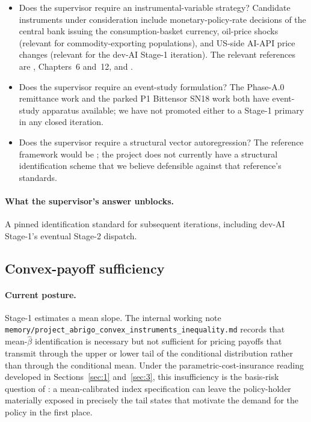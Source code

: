 \begin{itemize}
  \item Does the supervisor require an instrumental-variable strategy?
    Candidate instruments under consideration include
    monetary-policy-rate decisions of the central bank issuing the
    consumption-basket currency, oil-price shocks (relevant for
    commodity-exporting populations), and US-side AI-API price changes
    (relevant for the dev-AI Stage-1 iteration). The relevant references
    are \citet{hansen_2022}, Chapters~6 and~12, and
    \citet{wooldridge_2010}.
  \item Does the supervisor require an event-study formulation? The
    Phase-A.0 remittance work and the parked P1 Bittensor SN18 work both
    have event-study apparatus available; we have not promoted either to
    a Stage-1 primary in any closed iteration.
  \item Does the supervisor require a structural vector autoregression?
    The reference framework would be \citet{kilian_lutkepohl_2017}; the
    project does not currently have a structural identification scheme
    that we believe defensible against that reference's standards.
\end{itemize}

\paragraph{What the supervisor's answer unblocks.} A pinned identification
standard for subsequent iterations, including dev-AI Stage-1's eventual
Stage-2 dispatch.

\subsection{Convex-payoff sufficiency}\label{sec:7.2}

\paragraph{Current posture.} Stage-1 estimates a mean slope. The internal
working note
\texttt{memory/project\_abrigo\_convex\_instruments\_inequality.md}
records that mean-\(\hat{\beta}\) identification is necessary but not
sufficient for pricing payoffs that transmit through the upper or lower
tail of the conditional distribution rather than through the conditional
mean. Under the parametric-cost-insurance reading developed in
Sections~\ref{sec:1} and~\ref{sec:3}, this insufficiency is the
basis-risk question of \citet{clarke_2016}: a mean-calibrated index
specification can leave the policy-holder materially exposed in precisely
the tail states that motivate the demand for the policy in the first
place.

